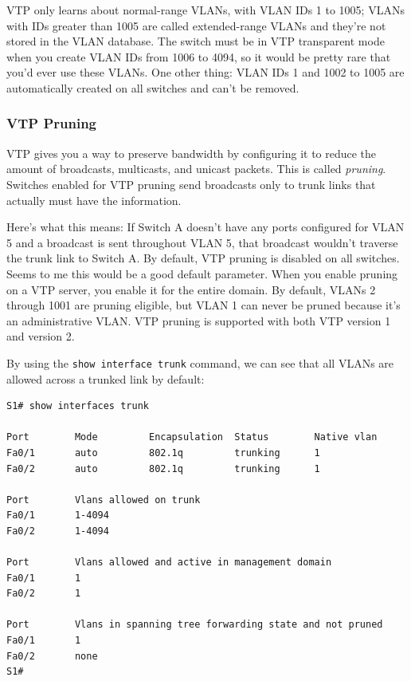 \documentclass[b5paper,11pt]{memoir}
\begin{document}
VTP only learns about normal-range VLANs, with VLAN IDs 1 to 1005; VLANs
with IDs greater than 1005 are called extended-range VLANs and they're
not stored in the VLAN database. The switch must be in VTP transparent
mode when you create VLAN IDs from 1006 to 4094, so it would be pretty
rare that you'd ever use these VLANs. One other thing: VLAN IDs 1 and
1002 to 1005 are automatically created on all switches and can't be
removed.

\subsubsection[VTP
Pruning]{\texorpdfstring{\protect\hypertarget{c15.xhtmlux5cux23c15-sec-6}{}{}VTP
Pruning}{VTP Pruning}}

VTP gives you a way to preserve bandwidth by configuring it to reduce
the amount of broadcasts, multicasts, and unicast packets. This is
called \emph{pruning}. Switches enabled for VTP pruning send broadcasts
only to trunk links that actually must have the information.

Here's what this means: If Switch A doesn't have any ports configured
for VLAN 5 and a broadcast is sent throughout VLAN 5, that broadcast
wouldn't traverse the trunk link to Switch A. By default, VTP pruning is
disabled on all switches. Seems to me this would be a good default
parameter. When you enable pruning on a VTP server, you enable it for
the entire domain. By default, VLANs 2 through 1001 are pruning
eligible, but VLAN 1 can never be pruned because it's an administrative
VLAN. VTP pruning is supported with both VTP version 1 and version 2.

By using the \texttt{show\ interface\ trunk} command, we can see that
all VLANs are allowed across a trunked link by default:

\begin{verbatim}
S1# show interfaces trunk

Port        Mode         Encapsulation  Status        Native vlan
Fa0/1       auto         802.1q         trunking      1
Fa0/2       auto         802.1q         trunking      1

Port        Vlans allowed on trunk
Fa0/1       1-4094
Fa0/2       1-4094

Port        Vlans allowed and active in management domain
Fa0/1       1
Fa0/2       1

Port        Vlans in spanning tree forwarding state and not pruned
Fa0/1       1
Fa0/2       none
S1#
\end{verbatim}
\end{document}
